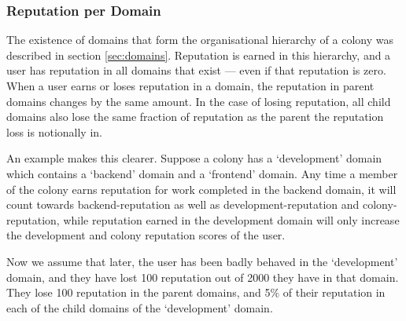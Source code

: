 



%

%
%
\subsubsection{Reputation per Domain}\label{sec:rep-by-domain}
The existence of domains that form the organisational hierarchy of a colony was described in section \ref{sec:domains}. Reputation is earned in this hierarchy, and a user has reputation in all domains that exist --- even if that reputation is zero. When a user earns or loses reputation in a domain, the reputation in parent domains changes by the same amount. In the case of losing reputation, all child domains also lose the same fraction of reputation as the parent the reputation loss is notionally in.

An example makes this clearer. Suppose a colony has a `development' domain which contains a `backend' domain and a `frontend' domain. Any time a member of the colony earns reputation for work completed in the backend domain, it will count towards backend-reputation as well as development-reputation and colony-reputation, while reputation earned in the development domain will only increase the development and colony reputation scores of the user.

Now we assume that later, the user has been badly behaved in the `development' domain, and they have lost 100 reputation out of 2000 they have in that domain. They lose 100 reputation in the parent domains, and 5\% of their reputation in each of the child domains of the `development' domain. 

